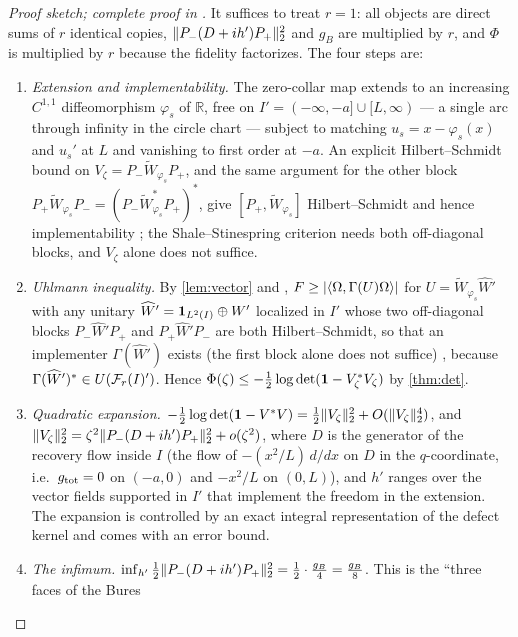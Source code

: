\begin{proof}[Proof sketch; complete proof in {\cite[\S\S2--8]{RigorUB}}]
It suffices to treat $r=1$: all objects are direct sums of $r$ identical copies,
$\lVert P_-(D+ih')P_+\rVert_2^2$ and $g_B$ are multiplied by $r$, and $\Phi$ is
multiplied by $r$ because the fidelity factorizes.  The four steps are:
\begin{enumerate}[label=(\roman*)]
\item \emph{Extension and implementability.}  The zero-collar map extends to an
increasing $C^{1,1}$ diffeomorphism $\varphi_s$ of $\mathbb R$, free on
$I'=(-\infty,-a]\cup[L,\infty)$ --- a single arc through infinity in the circle
chart --- subject to matching $u_s=x-\varphi_s(x)$ and $u_s'$ at $L$ and vanishing
to first order at $-a$.  An explicit Hilbert--Schmidt bound on
$V_\zeta=P_-\widetilde W_{\varphi_s}P_+$, and the same argument for the other block $P_+\widetilde W_{\varphi_s}P_-=(P_-\widetilde W_{\varphi_s}^*P_+)^*$, give $[P_+,\widetilde W_{\varphi_s}]$ Hilbert--Schmidt and hence implementability \cite[Cor.~2.7]{RigorUB}; the Shale--Stinespring criterion needs both off-diagonal blocks, and $V_\zeta$ alone does not suffice.
\item \emph{Uhlmann inequality.}  By \cref{lem:vector} and
\cite[Thm.~2(3)]{AU02}, $F\ge|\langle\Omega,\Gamma(U)\Omega\rangle|$ for
$U=\widetilde W_{\varphi_s}\widehat W'$ with any unitary $\widehat W'=\mathbf 1_{L^2(I)}\oplus W'$ localized in $I'$ whose two off-diagonal blocks $P_-\widehat W'P_+$ and $P_+\widehat W'P_-$ are both Hilbert--Schmidt, so that an implementer $\Gamma(\widehat W')$ exists (the first block alone does not suffice) \cite[Lem.~3.2]{RigorUB},
because $\Gamma(\widehat W')^*\in U(\mathcal F_r(I)')$.  Hence
$\Phi(\zeta)\le-\frac12\log\det(\mathbf 1-V_\zeta^*V_\zeta)$ by \cref{thm:det}.
\item \emph{Quadratic expansion.}  $-\frac12\log\det(\mathbf 1-V^*V)
=\frac12\lVert V_\zeta\rVert_2^2+O(\lVert V_\zeta\rVert_2^4)$, and
$\lVert V_\zeta\rVert_2^2=\zeta^2\lVert P_-(D+ih')P_+\rVert_2^2+o(\zeta^2)$, where $D$ is the
generator of the recovery flow inside $I$ (the flow of $-(x^2/L)\,d/dx$ on $D$ in the
$q$-coordinate, i.e.\ $g_{\rm tot}=0$ on $(-a,0)$ and $-x^2/L$ on $(0,L)$), and
$h'$ ranges over the vector fields supported in $I'$ that implement the freedom in
the extension.  The expansion is controlled by an exact integral representation of
the defect kernel and comes with an error bound.
\item \emph{The infimum.}  $\inf_{h'}\frac12\lVert P_-(D+ih')P_+\rVert_2^2
=\frac12\cdot\frac{g_B}4=\frac{g_B}8$.  This is the ``three faces of the Bures

\end{enumerate}
\end{proof}
